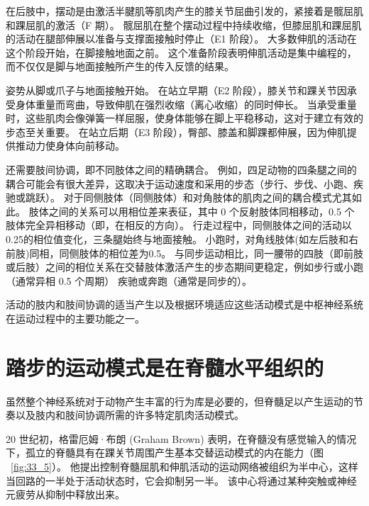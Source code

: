 在后肢中，摆动是由激活半腱肌等肌肉产生的膝关节屈曲引发的，紧接着是髋屈肌和踝屈肌的激活（F 期）。
髋屈肌在整个摆动过程中持续收缩，但膝屈肌和踝屈肌的活动在腿部伸展以准备与支撑面接触时停止（E1 阶段）。
大多数伸肌的活动在这个阶段开始，在脚接触地面之前。
这个准备阶段表明伸肌活动是集中编程的，而不仅仅是脚与地面接触所产生的传入反馈的结果。


姿势从脚或爪子与地面接触开始。
在站立早期（E2 阶段），膝关节和踝关节因承受身体重量而弯曲，导致伸肌在强烈收缩（离心收缩）的同时伸长。
当承受重量时，这些肌肉会像弹簧一样屈服，使身体能够在脚上平稳移动，这对于建立有效的步态至关重要。
在站立后期（E3 阶段），臀部、膝盖和脚踝都伸展，因为伸肌提供推动力使身体向前移动。


还需要肢间协调，即不同肢体之间的精确耦合。
例如，四足动物的四条腿之间的耦合可能会有很大差异，这取决于运动速度和采用的步态（步行、步伐、小跑、疾驰或跳跃）。
对于同侧肢体（同侧肢体）和对角肢体的肌肉之间的耦合模式尤其如此。
肢体之间的关系可以用相位差来表征，其中 0 个反射肢体同相移动，0.5 个肢体完全异相移动（即，在相反的方向）。
行走过程中，同侧肢体之间的活动以0.25的相位值变化，三条腿始终与地面接触。
小跑时，对角线肢体(如左后肢和右前肢)同相，同侧肢体的相位差为0.5。
与同步运动相比，同一腰带的四肢（即前肢或后肢）之间的相位关系在交替肢体激活产生的步态期间更稳定，例如步行或小跑（通常异相 0.5 个周期） 疾驰或奔跑（通常是同步的）。


活动的肢内和肢间协调的适当产生以及根据环境适应这些活动模式是中枢神经系统在运动过程中的主要功能之一。



\section{踏步的运动模式是在脊髓水平组织的}

虽然整个神经系统对于动物产生丰富的行为库是必要的，但脊髓足以产生运动的节奏以及肢内和肢间协调所需的许多特定肌肉活动模式。


20 世纪初，格雷厄姆·布朗 (Graham Brown) 表明，在脊髓没有感觉输入的情况下，孤立的脊髓具有在踝关节周围产生基本交替运动模式的内在能力（图 ~\ref{fig:33_5}）。
他提出控制脊髓屈肌和伸肌活动的运动网络被组织为半中心，这样当回路的一半处于活动状态时，它会抑制另一半。
该中心将通过某种突触或神经元疲劳从抑制中释放出来。


